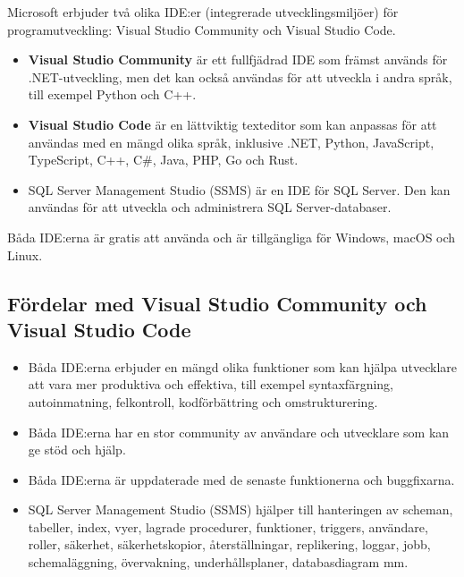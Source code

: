 Microsoft erbjuder två olika IDE:er (integrerade utvecklingsmiljöer) för
programutveckling: Visual Studio Community och Visual Studio Code.

\begin{itemize}
\tightlist
\item
  \textbf{Visual Studio Community} är ett fullfjädrad IDE som främst
  används för .NET-utveckling, men det kan också användas för att
  utveckla i andra språk, till exempel Python och C++.
\item
  \textbf{Visual Studio Code} är en lättviktig texteditor som kan
  anpassas för att användas med en mängd olika språk, inklusive .NET,
  Python, JavaScript, TypeScript, C++, C\#, Java, PHP, Go och Rust.
\item
  SQL Server Management Studio (SSMS) är en IDE för SQL Server. Den kan
  användas för att utveckla och administrera SQL Server-databaser.
\end{itemize}

Båda IDE:erna är gratis att använda och är tillgängliga för Windows,
macOS och Linux.

\hypertarget{fuxf6rdelar-med-visual-studio-community-och-visual-studio-code}{%
\subsection{Fördelar med Visual Studio Community och Visual Studio
Code}\label{fuxf6rdelar-med-visual-studio-community-och-visual-studio-code}}

\begin{itemize}
\tightlist
\item
  Båda IDE:erna erbjuder en mängd olika funktioner som kan hjälpa
  utvecklare att vara mer produktiva och effektiva, till exempel
  syntaxfärgning, autoinmatning, felkontroll, kodförbättring och
  omstrukturering.
\item
  Båda IDE:erna har en stor community av användare och utvecklare som
  kan ge stöd och hjälp.
\item
  Båda IDE:erna är uppdaterade med de senaste funktionerna och
  buggfixarna.
\item
  SQL Server Management Studio (SSMS) hjälper till hanteringen av
  scheman, tabeller, index, vyer, lagrade procedurer, funktioner,
  triggers, användare, roller, säkerhet, säkerhetskopior,
  återställningar, replikering, loggar, jobb, schemaläggning,
  övervakning, underhållsplaner, databasdiagram mm.
\end{itemize}

